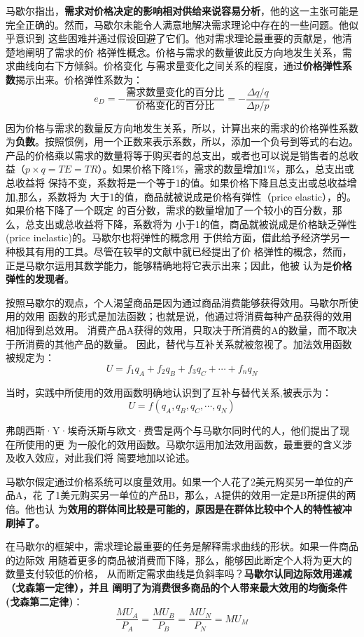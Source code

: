 马歇尔指出，\textbf{需求对价格决定的影响相对供给来说容易分析}，他的这一主张可能是
完全正确的。然而，马歇尔未能令人满意地解决需求理论中存在的一些问题。他似乎意识到
这些困难并通过假设回避了它们。他对需求理论最重要的贡献是，他清楚地阐明了需求的价
格弹性概念。价格与需求的数量彼此反方向地发生关系，需求曲线向右下方倾斜。价格变化
与需求量变化之间关系的程度，通过\textbf{价格弹性系数}揭示出来。价格弹性系数为：
\[e_D = - \frac{需求数量变化的百分比}{价格变化的百分比} = - \frac{\Delta
    q/q}{\Delta p /p}\]

因为价格与需求的数量反方向地发生关系，所以，计算出来的需求的价格弹性系数
为\textbf{负数}。按照惯例，用一个正数来表示系数，所以，添加一个负号到等式的右边。
产品的价格乘以需求的数量将等于购买者的总支出，或者也可以说是销售者的总收益（$p
\times q = TE =TR$）。如果价格下降1\%，需求的数量增加1\%，那么，总支出或总收益将
保持不变，系数将是一个等于1的值。如果价格下降且总支出或总收益增加,那么，系数将为
大于1的值，商品就被说成是价格有弹性（price elastic），的。如果价格下降了一个既定
的百分数，需求的数量增加了一个较小的百分数，那么，总支出或总收益将下降，系数将为
小于1的值，商品就被说成是价格缺乏弹性(price inelastic)的。马歇尔也将弹性的概念用
于供给方面，借此给予经济学另一种极其有用的工具。尽管在较早的文献中就已经提出了价
格弹性的概念，然而，正是马歇尔运用其数学能力，能够精确地将它表示出来；因此，他被
认为是\textbf{价格弹性的发现者}。

按照马歇尔的观点，个人渴望商品是因为通过商品消费能够获得效用。马歇尔所使用的效用
函数的形式是加法函数；也就是说，他通过将消费每种产品获得的效用相加得到总效用。
消费产品A获得的效用，只取决于所消费的A的数量，而不取决于所消费的其他产品的数量。
因此，替代与互补关系就被忽视了。加法效用函数被规定为：
\[U = f_1q_A + f_2q_B + f_3q_C + \cdots + f_nq_N\]

当时，实践中所使用的效用函数明确地认识到了互补与替代关系,被表示为：
\[U = f(q_A, q_B, q_C, \cdots, q_N)\]

弗朗西斯·Y·埃奇沃斯与欧文·费雪是两个与马歇尔同时代的人，他们提出了现在所使用的更
为一般化的效用函数。马歇尔运用加法效用函数，最重要的含义涉及收入效应，对此我们将
简要地加以论述。

马歇尔假定通过价格系统可以度量效用。如果一个人花了2美元购买另一单位的产品A，花
了1美元购买另一单位的产品B，那么，A提供的效用一定是B所提供的两倍。他也认
为\textbf{效用的群体间比较是可能的，原因是在群体比较中个人的特性被冲刷掉了。}

在马歇尔的框架中，需求理论最重要的任务是解释需求曲线的形状。如果一件商品的边际效
用随着更多的商品被消费而下降，那么，能够因此断定个人将为更大的数量支付较低的价格，
从而断定需求曲线是负斜率吗？\textbf{马歇尔认同边际效用递减（戈森第一定律），并且
  阐明了为消费很多商品的个人带来最大效用的均衡条件(戈森第二定律)}：
\begin{equation}
  \label{eq:1}
  \frac{MU_A}{P_A} = \frac{MU_B}{P_B} = \frac{MU_N}{P_N} =MU_M
\end{equation}

